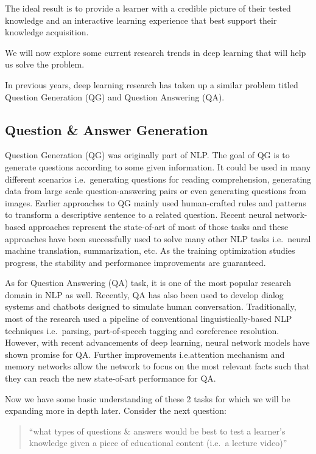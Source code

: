 \documentclass[]{book}
\theoremstyle{definition}
\theoremstyle{definition}
\theoremstyle{definition}
\theoremstyle{remark}
\begin{document}
The ideal result is to provide a learner with a credible picture of
their tested knowledge and an interactive learning experience that best
support their knowledge acquisition.

We will now explore some current research trends in deep learning that
will help us solve the problem.

In previous years, deep learning research has taken up a similar problem
titled Question Generation (QG) and Question Answering (QA).

\subsection{Question \& Answer
Generation}\label{question-answer-generation}

Question Generation (QG) was originally part of NLP. The goal of QG is
to generate questions according to some given information. It could be
used in many different scenarios i.e.~generating questions for reading
comprehension, generating data from large scale question-answering pairs
or even generating questions from images. Earlier approaches to QG
mainly used human-crafted rules and patterns to transform a descriptive
sentence to a related question. Recent neural network-based approaches
represent the state-of-art of most of those tasks and these approaches
have been successfully used to solve many other NLP tasks i.e.~neural
machine translation, summarization, etc. As the training optimization
studies progress, the stability and performance improvements are
guaranteed.

As for Question Answering (QA) task, it is one of the most popular
research domain in NLP as well. Recently, QA has also been used to
develop dialog systems and chatbots designed to simulate human
conversation. Traditionally, most of the research used a pipeline of
conventional linguistically-based NLP techniques i.e.~parsing,
part-of-speech tagging and coreference resolution. However, with recent
advancements of deep learning, neural network models have shown promise
for QA. Further improvements i.e.attention mechanism and memory networks
allow the network to focus on the most relevant facts such that they can
reach the new state-of-art performance for QA.

Now we have some basic understanding of these 2 tasks for which we will
be expanding more in depth later. Consider the next question:

\begin{quote}
``what types of questions \& answers would be best to test a learner's
knowledge given a piece of educational content (i.e.~a lecture video)''
\end{quote}
\end{document}
